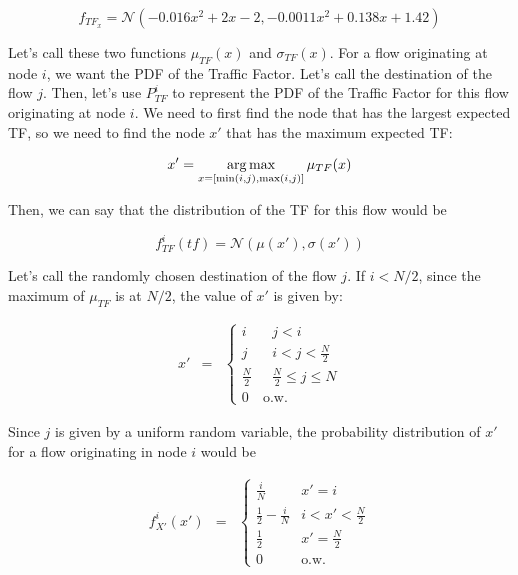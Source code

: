 \begin{equation}
	f_{TF_x} = \mathcal{N}(-0.016x^2+2x-2, -0.0011x^2+0.138x+1.42)
\end{equation}

Let's call these two functions $\mu_{TF}(x)$ and $\sigma_{TF}(x)$.  For a flow originating at node $i$, we want the PDF of the Traffic Factor.  Let's call the destination of the flow $j$.  Then, let's use $P_{TF}^i$ to represent the PDF of the Traffic Factor for this flow originating at node $i$.  
We need to first find the node that has the largest expected TF, so we need to find the node $x'$ that has the maximum expected TF:

\begin{equation}
	x' = \operatorname*{arg\,max}_{x = [\min(i,j), \max(i,j)]} \mu_{TF}(x) 
\end{equation}

Then, we can say that the distribution of the TF for this flow would be

\begin{equation}
	f_{TF}^{i}(tf) = \mathcal{N}(\mu(x'), \sigma(x'))
	\label{eq:pdf_TF_1}
\end{equation}

Let's call the randomly chosen destination of the flow $j$. If $i < N/2$, since the maximum of $\mu_{TF}$ is at $N/2$, the value of $x'$ is given by: 

\begin{eqnarray*}
	x' &=&
		\left\{\begin{array}{ll}
		i & \mbox{    } j < i \\
		j & \mbox{    } i < j < \frac{N}{2} \\
		\frac{N}{2} & \mbox{    } \frac{N}{2} \leq j \leq N \\ 
		0 &\mbox{o.w.}
		\end{array}\right.
\end{eqnarray*}

Since $j$ is given  by a uniform random variable, the probability distribution of $x'$ for a flow originating in node $i$ would be

\begin{eqnarray}
	f_{X'}^i(x') &=&
		\left\{\begin{array}{ll}
		\frac{i}{N} & x' = i  \\
		 \frac{1}{2} - \frac{i}{N} & i < x' < \frac{N}{2} \\
		 \frac{1}{2} & x' = \frac{N}{2} \\ 
		0 &\mbox{o.w.}
		\end{array}\right.
		\label{eq:PDF_x_prime}
\end{eqnarray}

